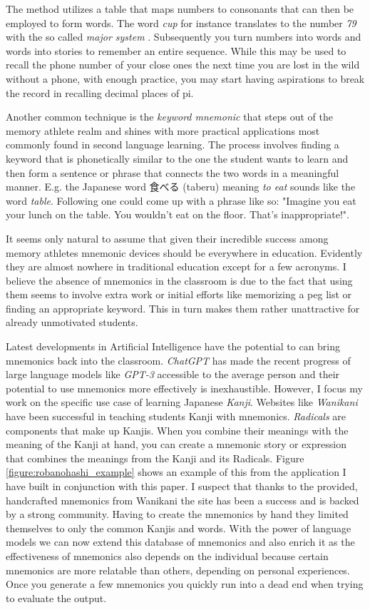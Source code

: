 The method utilizes a table that maps numbers to consonants that can then be employed to form words. The word \emph{cup} for instance translates to the number \emph{79} with the so called \emph{major system} \cite{major_system}. Subsequently you turn numbers into words and words into stories to remember an entire sequence.
While this may be used to recall the phone number of your close ones the next time you are lost in the wild without a phone, with enough practice, you may start having aspirations to break the record in recalling decimal places of pi.

Another common technique is the \emph{keyword mnemonic} that steps out of the memory athlete realm and shines with more practical applications most commonly found in second language learning. The process involves finding a keyword that is phonetically similar to the one the student wants to learn and then form a sentence or phrase that connects the two words in a meaningful manner. E.g. the Japanese word 食べる (taberu) meaning \emph{to eat} sounds like the word \emph{table}. Following one could come up with a phrase like so: "Imagine you eat your lunch on the table. You wouldn't eat on the floor. That's inappropriate!". 

It seems only natural to assume that given their incredible success among memory athletes mnemonic devices should be everywhere in education. Evidently they are almost nowhere in traditional education except for a few acronyms.
I believe the absence of mnemonics in the classroom is due to the fact that using them seems to involve extra work or initial efforts like memorizing a peg list or finding an appropriate keyword. This in turn makes them rather unattractive for already unmotivated students.

Latest developments in Artificial Intelligence have the potential to can bring mnemonics back into the classroom. \emph{ChatGPT} has made the recent progress of large language models like \emph{GPT-3} accessible to the average person and their potential to use mnemonics more effectively is inexhaustible. However, I focus my work on the specific use case of learning Japanese \emph{Kanji}. Websites like \emph{Wanikani} \cite{wanikani} have been successful in teaching students Kanji with mnemonics. \emph{Radicals} are components that make up Kanjis. When you combine their meanings with the meaning of the Kanji at hand, you can create a mnemonic story or expression that combines the meanings from the Kanji and its Radicals. Figure \ref{figure:robanohashi_example} shows an example of this from the application I have built in conjunction with this paper.
I suspect that thanks to the provided, handcrafted mnemonics from Wanikani the site has been a success and is backed by a strong community. Having to create the mnemonics by hand they limited themselves to only the common Kanjis and words. With the power of language models we can now extend this database of mnemonics and also enrich it as the effectiveness of mnemonics also depends on the individual because certain mnemonics are more relatable than others, depending on personal experiences. Once you generate a few mnemonics you quickly run into a dead end when trying to evaluate the output. 

